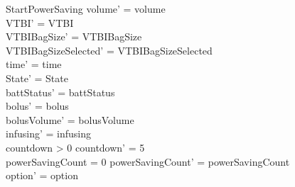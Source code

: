 \begin{schema}{StartPowerSaving}
	volume' = volume\\
	VTBI' = VTBI\\
	VTBIBagSize' = VTBIBagSize\\ VTBIBagSizeSelected' = VTBIBagSizeSelected\\
	time' = time\\ State' = State\\
	battStatus' = battStatus\\
	bolus' = bolus\\
	bolusVolume' = bolusVolume\\
	infusing' = infusing\\
	countdown > 0 \land countdown' = 5\\
	powerSavingCount = 0 \land powerSavingCount' = powerSavingCount\\ option' = option\\
\end{schema}

